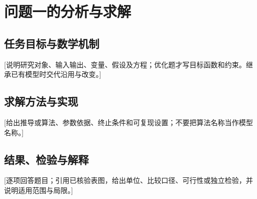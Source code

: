 \section{问题一的分析与求解}
\subsection{任务目标与数学机制}
[说明研究对象、输入输出、变量、假设及方程；优化题才写目标函数和约束。继承已有模型时交代沿用与改变。]
\subsection{求解方法与实现}
[给出推导或算法、参数依据、终止条件和可复现设置；不要把算法名称当作模型名称。]
\subsection{结果、检验与解释}
[逐项回答题目；引用已核验表图，给出单位、比较口径、可行性或独立检验，并说明适用范围与局限。]
